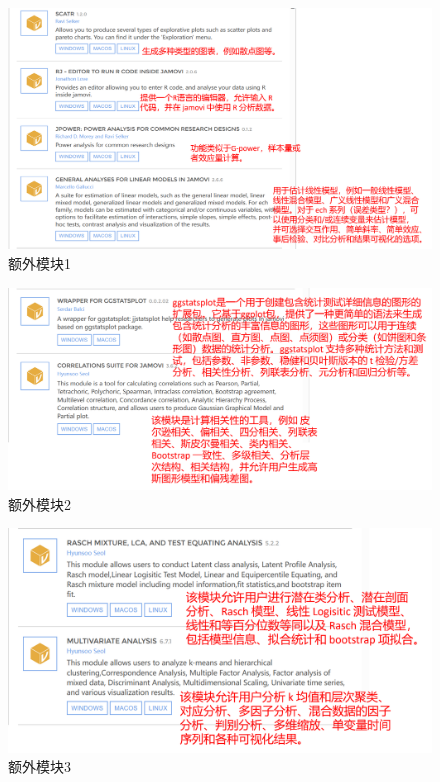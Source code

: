 \documentclass[]{ctexbook}
\theoremstyle{definition}
\theoremstyle{definition}
\theoremstyle{definition}
\theoremstyle{definition}
\theoremstyle{remark}
\begin{document}
\begin{figure}

{\centering \includegraphics[width=1\linewidth]{img/jamovi/modules2} 

}

\caption{额外模块1}\label{fig:jamovi-modules2}
\end{figure}

\begin{figure}

{\centering \includegraphics[width=1\linewidth]{img/jamovi/modules3} 

}

\caption{额外模块2}\label{fig:jamovi-modules3}
\end{figure}

\begin{figure}

{\centering \includegraphics[width=1\linewidth]{img/jamovi/modules4} 

}

\caption{额外模块3}\label{fig:jamovi-modules4}
\end{figure}
\end{document}
